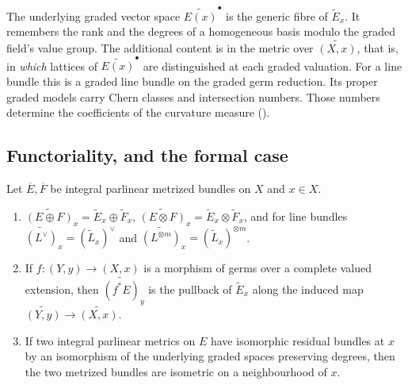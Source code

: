 \begin{remark}
\label{rem:ch17-residual-bundle-not-space}
The underlying graded vector space $\widetilde{E(x)}^{\bullet}$ is the
generic fibre of $\widetilde E_x$.  It remembers the rank and the
degrees of a homogeneous basis modulo the graded field's value group.
The additional content is in the metric over $\widetilde{(X,x)}$,
that is, in \emph{which} lattices of $\widetilde{E(x)}^{\bullet}$ are
distinguished at each graded valuation.  For a line bundle this is a graded
line bundle on the graded germ reduction.  Its proper graded models carry
Chern classes and intersection numbers.  Those numbers determine the
coefficients of the curvature measure
().
\end{remark}

\subsection{Functoriality, and the formal case}
\label{sec:ch17-residual-functorial}

\begin{proposition}
\label{prop:ch17-residual-functorial}
Let $\overline E,\overline F$ be integral parlinear metrized bundles on
$X$ and $x\in X$.
\begin{enumerate}
\item\label{itm:ch17-res:ops}
 $\widetilde{(E\oplus F)}_x=\widetilde E_x\oplus\widetilde F_x$,
 $\widetilde{(E\otimes F)}_x=\widetilde E_x\otimes\widetilde F_x$, and
 for line bundles $\widetilde{(L^{\vee})}_x=(\widetilde L_x)^{\vee}$ and
 $\widetilde{(L^{\otimes m})}_x=(\widetilde L_x)^{\otimes m}$.
\item\label{itm:ch17-res:pull}
 If $f:(Y,y)\to(X,x)$ is a morphism of germs over a complete valued
 extension, then $\widetilde{(f^*E)}_y$ is the pullback of
 $\widetilde E_x$ along the induced map
 $\widetilde{(Y,y)}\to\widetilde{(X,x)}$.
\item\label{itm:ch17-res:iso}
 If two integral parlinear metrics on $E$ have isomorphic residual
 bundles at $x$ by an isomorphism of the underlying graded spaces
 preserving degrees, then the two metrized bundles are isometric on a
 neighbourhood of $x$.
\end{enumerate}
\end{proposition}

